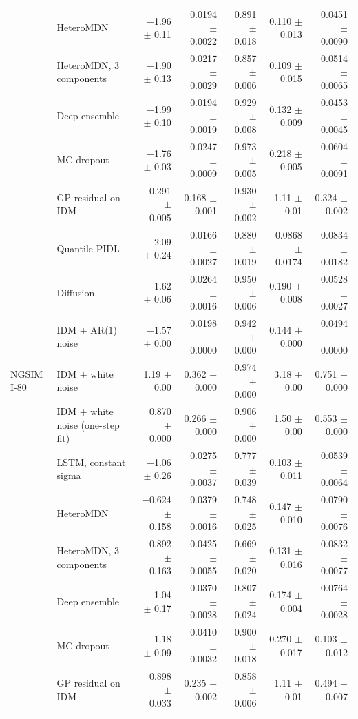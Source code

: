 \begin{longtable}{llrrrrr}
 & HeteroMDN & $-$1.96 $\pm$ 0.11 & 0.0194 $\pm$ 0.0022 & 0.891 $\pm$ 0.018 & 0.110 $\pm$ 0.013 & 0.0451 $\pm$ 0.0090 \\
 & HeteroMDN, 3 components & $-$1.90 $\pm$ 0.13 & 0.0217 $\pm$ 0.0029 & 0.857 $\pm$ 0.006 & 0.109 $\pm$ 0.015 & 0.0514 $\pm$ 0.0065 \\
 & Deep ensemble & $-$1.99 $\pm$ 0.10 & 0.0194 $\pm$ 0.0019 & 0.929 $\pm$ 0.008 & 0.132 $\pm$ 0.009 & 0.0453 $\pm$ 0.0045 \\
 & MC dropout & $-$1.76 $\pm$ 0.03 & 0.0247 $\pm$ 0.0009 & 0.973 $\pm$ 0.005 & 0.218 $\pm$ 0.005 & 0.0604 $\pm$ 0.0091 \\
 & GP residual on IDM & 0.291 $\pm$ 0.005 & 0.168 $\pm$ 0.001 & 0.930 $\pm$ 0.002 & 1.11 $\pm$ 0.01 & 0.324 $\pm$ 0.002 \\
 & Quantile PIDL & $-$2.09 $\pm$ 0.24 & 0.0166 $\pm$ 0.0027 & 0.880 $\pm$ 0.019 & 0.0868 $\pm$ 0.0174 & 0.0834 $\pm$ 0.0182 \\
 & Diffusion & $-$1.62 $\pm$ 0.06 & 0.0264 $\pm$ 0.0016 & 0.950 $\pm$ 0.006 & 0.190 $\pm$ 0.008 & 0.0528 $\pm$ 0.0027 \\
 & IDM + AR(1) noise & $-$1.57 $\pm$ 0.00 & 0.0198 $\pm$ 0.0000 & 0.942 $\pm$ 0.000 & 0.144 $\pm$ 0.000 & 0.0494 $\pm$ 0.0000 \\
\midrule
NGSIM I-80 & IDM + white noise & 1.19 $\pm$ 0.00 & 0.362 $\pm$ 0.000 & 0.974 $\pm$ 0.000 & 3.18 $\pm$ 0.00 & 0.751 $\pm$ 0.000 \\
 & IDM + white noise (one-step fit) & 0.870 $\pm$ 0.000 & 0.266 $\pm$ 0.000 & 0.906 $\pm$ 0.000 & 1.50 $\pm$ 0.00 & 0.553 $\pm$ 0.000 \\
 & LSTM, constant sigma & $-$1.06 $\pm$ 0.26 & 0.0275 $\pm$ 0.0037 & 0.777 $\pm$ 0.039 & 0.103 $\pm$ 0.011 & 0.0539 $\pm$ 0.0064 \\
 & HeteroMDN & $-$0.624 $\pm$ 0.158 & 0.0379 $\pm$ 0.0016 & 0.748 $\pm$ 0.025 & 0.147 $\pm$ 0.010 & 0.0790 $\pm$ 0.0076 \\
 & HeteroMDN, 3 components & $-$0.892 $\pm$ 0.163 & 0.0425 $\pm$ 0.0055 & 0.669 $\pm$ 0.020 & 0.131 $\pm$ 0.016 & 0.0832 $\pm$ 0.0077 \\
 & Deep ensemble & $-$1.04 $\pm$ 0.17 & 0.0370 $\pm$ 0.0028 & 0.807 $\pm$ 0.024 & 0.174 $\pm$ 0.004 & 0.0764 $\pm$ 0.0028 \\
 & MC dropout & $-$1.18 $\pm$ 0.09 & 0.0410 $\pm$ 0.0032 & 0.900 $\pm$ 0.018 & 0.270 $\pm$ 0.017 & 0.103 $\pm$ 0.012 \\
 & GP residual on IDM & 0.898 $\pm$ 0.033 & 0.235 $\pm$ 0.002 & 0.858 $\pm$ 0.006 & 1.11 $\pm$ 0.01 & 0.494 $\pm$ 0.007 \\

\end{longtable}

